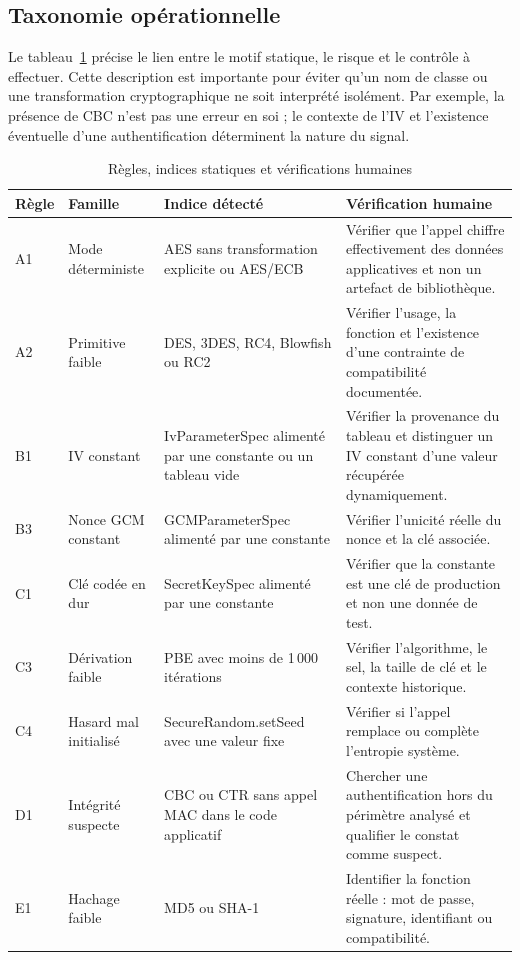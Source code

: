 \documentclass[conference,a4paper]{IEEEtran}
\begin{document}
\subsection{Taxonomie opérationnelle}
Le tableau~\ref{tab:taxonomie-detaillee} précise le lien entre le motif statique, le risque et le contrôle à effectuer. Cette description est importante pour éviter qu'un nom de classe ou une transformation cryptographique ne soit interprété isolément. Par exemple, la présence de CBC n'est pas une erreur en soi ; le contexte de l'IV et l'existence éventuelle d'une authentification déterminent la nature du signal.

\begin{table}[t]
\caption{Règles, indices statiques et vérifications humaines}
\label{tab:taxonomie-detaillee}
\centering\small
\begin{tabular}{p{0.7cm}p{3.1cm}p{4.2cm}p{5.0cm}}
\toprule
Règle & Famille & Indice détecté & Vérification humaine \\
\midrule
A1 & Mode déterministe & AES sans transformation explicite ou AES/ECB & Vérifier que l'appel chiffre effectivement des données applicatives et non un artefact de bibliothèque. \\
A2 & Primitive faible & DES, 3DES, RC4, Blowfish ou RC2 & Vérifier l'usage, la fonction et l'existence d'une contrainte de compatibilité documentée. \\
B1 & IV constant & IvParameterSpec alimenté par une constante ou un tableau vide & Vérifier la provenance du tableau et distinguer un IV constant d'une valeur récupérée dynamiquement. \\
B3 & Nonce GCM constant & GCMParameterSpec alimenté par une constante & Vérifier l'unicité réelle du nonce et la clé associée. \\
C1 & Clé codée en dur & SecretKeySpec alimenté par une constante & Vérifier que la constante est une clé de production et non une donnée de test. \\
C3 & Dérivation faible & PBE avec moins de 1\,000 itérations & Vérifier l'algorithme, le sel, la taille de clé et le contexte historique. \\
C4 & Hasard mal initialisé & SecureRandom.setSeed avec une valeur fixe & Vérifier si l'appel remplace ou complète l'entropie système. \\
D1 & Intégrité suspecte & CBC ou CTR sans appel MAC dans le code applicatif & Chercher une authentification hors du périmètre analysé et qualifier le constat comme suspect. \\
E1 & Hachage faible & MD5 ou SHA-1 & Identifier la fonction réelle : mot de passe, signature, identifiant ou compatibilité. \\
\bottomrule
\end{tabular}
\end{table}
\end{document}
